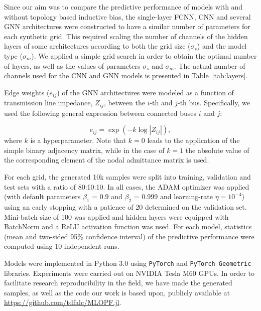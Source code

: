 \documentclass[journal]{IEEEtran}
\begin{document}
Since our aim was to compare the predictive performance of models with and without topology based inductive bias, the single-layer FCNN, CNN and several GNN architectures were constructed to have a similar number of parameters for each synthetic grid.
This required scaling the number of channels of the hidden layers of some architectures according to both the grid size ($\sigma_{s}$) and the model type ($\sigma_{m}$).
We applied a simple grid search in order to obtain the optimal number of layers, as well as the values of parameters $\sigma_{s}$ and $\sigma_{m}$.
The actual number of channels used for the CNN and GNN models is presented in Table~\ref{tab:layers}.

Edge weights ($e_{ij}$) of the GNN architectures were modeled as a function of transmission line impedance, $Z_{ij}$, between the $i$-th and $j$-th bus. Specifically, we used the following general expression between connected buses $i$ and $j$:

\begin{equation}
    e_{ij} = \exp(-k \log|Z_{ij}|),
    \label{edge-weights}
\end{equation}
where $k$ is a hyperparameter.
Note that $k = 0$ leads to the application of the simple binary adjacency matrix, while in the case of $k = 1$ the absolute value of the corresponding element of the nodal admittance matrix is used.

For each grid, the generated 10k samples were split into training, validation and test sets with a ratio of 80:10:10. In all cases, the ADAM \cite{Diederik2014} optimizer was applied (with default parameters $\beta_1$ = 0.9 and $\beta_2$ = 0.999 and learning-rate $\eta=10^{-4}$) using an early stopping with a patience of 20 determined on the validation set. Mini-batch size of 100 was applied and hidden layers were equipped with BatchNorm \cite{Ioffe2015} and a ReLU \cite{Xu2015} activation function was used.
For each model, statistics (mean and two-sided 95\% confidence interval) of the predictive performance were computed using 10 independent runs. 

Models were implemented in Python 3.0 using \texttt{PyTorch} \cite{Paszke2019} and \texttt{PyTorch Geometric} \cite{Fey2019} libraries.
Experiments were carried out on NVIDIA Tesla M60 GPUs. In order to facilitate research reproducibility in the field, we have made the generated samples, as well as the code our work is based upon, publicly available at \url{https://github.com/tdfalc/MLOPF.jl}.
\end{document}
